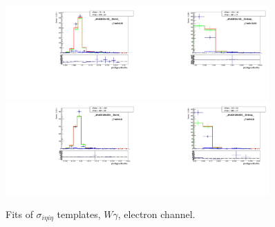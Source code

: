 \begin{figure}[htb]
\begin{center}
   \includegraphics[width=0.45\textwidth]{../figs/figs_v11/ELECTRON_WGamma/TemplateFits/c_TEMPL_SIHIH_UNblind__phoEt95to120__Barrel__RooFit.pdf}\includegraphics[width=0.45\textwidth]{../figs/figs_v11/ELECTRON_WGamma/TemplateFits/c_TEMPL_SIHIH_UNblind__phoEt95to120__Endcap__RooFit.pdf}\\
   \includegraphics[width=0.45\textwidth]{../figs/figs_v11/ELECTRON_WGamma/TemplateFits/c_TEMPL_SIHIH_UNblind__phoEt120to500__Barrel__RooFit.pdf}\includegraphics[width=0.45\textwidth]{../figs/figs_v11/ELECTRON_WGamma/TemplateFits/c_TEMPL_SIHIH_UNblind__phoEt120to500__Endcap__RooFit.pdf}\\
  \label{fig:templateFits_SIHIH_ELECTRON_3}
  \caption{Fits of $\sigma_{i \eta i \eta}$ templates, $W\gamma$, electron channel.}
  \end{center}
\end{figure}



